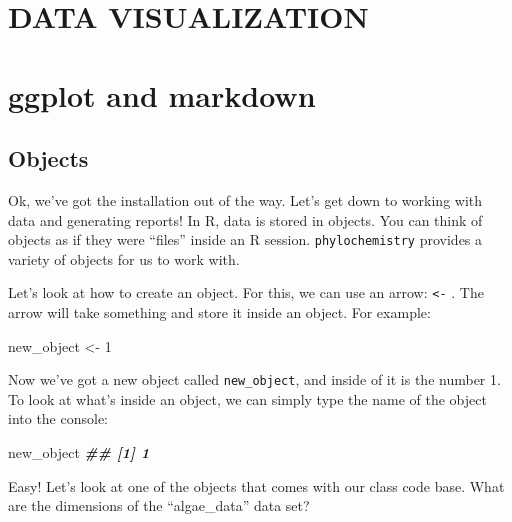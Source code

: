 \documentclass[
]{krantz}
\newenvironment{Shaded}{\begin{snugshade}}{\end{snugshade}}
\newcommand{\DecValTok}[1]{\textcolor[rgb]{0.00,0.00,0.81}{#1}}
\newcommand{\DocumentationTok}[1]{\textcolor[rgb]{0.56,0.35,0.01}{\textbf{\textit{#1}}}}
\newcommand{\NormalTok}[1]{#1}
\newcommand{\OtherTok}[1]{\textcolor[rgb]{0.56,0.35,0.01}{#1}}
\begin{document}
\hypertarget{section-1}{%
\section*{}\label{section-1}}

\hypertarget{data-visualization}{%
\section*{DATA VISUALIZATION}\label{data-visualization}}

\hypertarget{R_Markdown}{%
\section{ggplot and markdown}\label{R_Markdown}}

\hypertarget{objects}{%
\subsection{Objects}\label{objects}}

Ok, we've got the installation out of the way. Let's get down to working with data and generating reports! In R, data is stored in objects. You can think of objects as if they were ``files'' inside an R session. \texttt{phylochemistry} provides a variety of objects for us to work with.

Let's look at how to create an object. For this, we can use an arrow: \texttt{\textless{}-} . The arrow will take something and store it inside an object. For example:

\begin{Shaded}
\begin{Highlighting}[]
\NormalTok{new\_object }\OtherTok{\textless{}{-}} \DecValTok{1}
\end{Highlighting}
\end{Shaded}

Now we've got a new object called \texttt{new\_object}, and inside of it is the number 1. To look at what's inside an object, we can simply type the name of the object into the console:

\begin{Shaded}
\begin{Highlighting}[]
\NormalTok{new\_object}
\DocumentationTok{\#\# [1] 1}
\end{Highlighting}
\end{Shaded}

Easy! Let's look at one of the objects that comes with our class code base. What are the dimensions of the ``algae\_data'' data set?
\end{document}
